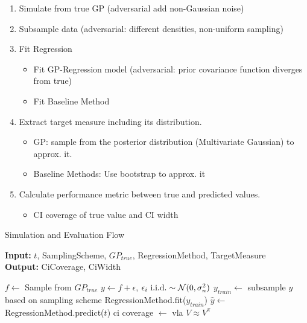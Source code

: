 \begin{enumerate}
    \item Simulate from true GP (adversarial add non-Gaussian noise)
    \item Subsample data (adversarial: different densities, non-uniform sampling)
    \item Fit Regression
    \begin{itemize}
        \item Fit GP-Regression model (adversarial: prior covariance function diverges from true)
        \item Fit Baseline Method
    \end{itemize}
    \item Extract target measure including its distribution.
        \begin{itemize}
            \item GP: sample from the posterior distribution (Multivariate Gaussian) to approx. it.
            \item Baseline Methods: Use bootstrap to approx. it
        \end{itemize}
    \item Calculate performance metric between true and predicted values.
    \begin{itemize}
        \item CI coverage of true value and CI width
    \end{itemize}

\end{enumerate}


\begin{algorithm} \caption{Simulation and Evaluation Flow}
 \hspace*{\algorithmicindent} \textbf{Input:} $t$, SamplingScheme, $GP_{true}$,
RegressionMethod, TargetMeasure\\
 \hspace*{\algorithmicindent} \textbf{Output:} CiCoverage, CiWidth
\begin{algorithmic}[1]

        \State $f \gets$ Sample from $GP_{true}$
        \State $y \gets f + \epsilon$, $\epsilon_i \text{ i.i.d.} \sim \operatorname{\mathcal{N}}(0, \sigma_n^2)$
        \State $y_{train} \gets$ subsample $y$ based on sampling scheme
        \State RegressionMethod.fit($y_{train} $)
        \State $\hat{y} \gets$ RegressionMethod.predict($t$)
        \State ci coverage $\gets$ vla
        \EndFor
    \Ensure $V \approx V^\pi$
\end{algorithmic}
\end{algorithm}


